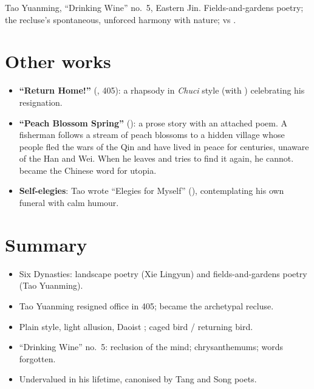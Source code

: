 \begin{important}
Tao Yuanming, ``Drinking Wine'' no.~5, Eastern Jin. Fields-and-gardens poetry; the
recluse's spontaneous, unforced harmony with nature;  vs .
\end{important}

\section{Other works}

\begin{itemize}
  \item \textbf{``Return Home!''} (, 405): a rhapsody in \emph{Chuci}
        style (with ) celebrating his resignation.
  \item \textbf{``Peach Blossom Spring''} (): a prose story with an
        attached poem. A fisherman follows a stream of peach blossoms to a hidden village
        whose people fled the wars of the Qin and have lived in peace for centuries,
        unaware of the Han and Wei. When he leaves and tries to find it again, he cannot.
         became the Chinese word for utopia.
  \item \textbf{Self-elegies}: Tao wrote ``Elegies for Myself'' (),
        contemplating his own funeral with calm humour.
\end{itemize}

\section*{Summary}
\begin{itemize}
  \item Six Dynasties: landscape poetry (Xie Lingyun) and fields-and-gardens poetry (Tao
        Yuanming).
  \item Tao Yuanming resigned office in 405; became the archetypal recluse.
  \item Plain style, light allusion, Daoist ; caged bird / returning bird.
  \item ``Drinking Wine'' no.~5: reclusion of the mind; chrysanthemums; words forgotten.
  \item Undervalued in his lifetime, canonised by Tang and Song poets.
\end{itemize}
